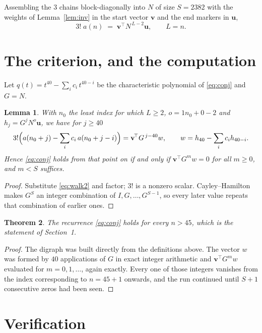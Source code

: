 \documentclass[11pt,a4paper]{article}
\theoremstyle{plain}
\newtheorem{theorem}{Theorem}
\newtheorem{lemma}[theorem]{Lemma}
\theoremstyle{definition}
\begin{document}
Assembling the $3$ chains block-diagonally into $N$ of size $S=2382$ with the weights of
Lemma~\ref{lem:inv} in the start vector $\mathbf{v}$ and the end markers in
$\mathbf{u}$,
\begin{equation}\label{eq:walk2}
3!\;a(n)\;=\;\mathbf{v}^{\!\top}N^{\,L-2}\mathbf{u},\qquad L=n .
\end{equation}

\section{The criterion, and the computation}

Let $q(t)=t^{40}-\sum_i c_i\,t^{40-i}$ be the characteristic polynomial of
\eqref{eq:conj} and $G=N$.

\begin{lemma}\label{lem:crit}
With $n_0$ the least index for which $L\ge2$, $o=1n_0+0-2$ and
$h_j=G^{j}N^{o}\mathbf{u}$, we have for $j\ge40$
\[
3!\Bigl(a(n_0+j)-\sum_i c_i\,a(n_0+j-i)\Bigr)=\mathbf{v}^{\!\top}G^{\,j-40}w,
\qquad w=h_{40}-\sum_i c_i h_{40-i} .
\]
Hence \eqref{eq:conj} holds from that point on if and only if
$\mathbf{v}^{\!\top}G^{m}w=0$ for all $m\ge0$, and $m<S$ suffices.
\end{lemma}

\begin{proof}
Substitute \eqref{eq:walk2} and factor; $3!$ is a nonzero scalar. Cayley--Hamilton
makes $G^{S}$ an integer combination of $I,G,\dots,G^{S-1}$, so every later value repeats
that combination of earlier ones.
\end{proof}

\begin{theorem}
The recurrence \eqref{eq:conj} holds for every $n>45$, which is the statement of
Section~1.
\end{theorem}

\begin{proof}
The digraph was built directly from the definitions above. The vector $w$ was formed by
$40$ applications of $G$ in exact integer arithmetic and $\mathbf{v}^{\!\top}G^{m}w$
evaluated for $m=0,1,\dots$, again exactly. Every one of those integers vanishes from the
index corresponding to $n=45+1$ onwards, and the run continued until $S+1$ consecutive
zeros had been seen.
\end{proof}

\section{Verification}
\end{document}
